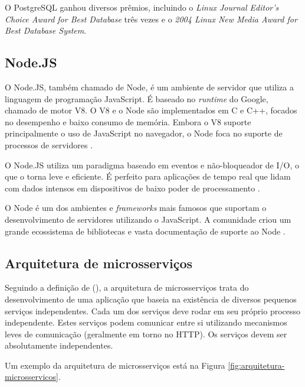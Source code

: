 O PostgreSQL ganhou diversos prêmios, incluindo o \textit{Linux Journal Editor's Choice Award for Best Database} três vezes e o \textit{2004 Linux New Media Award for Best Database System}.

\subsection{Node.JS}

O Node.JS, também chamado de Node, é um ambiente de servidor que utiliza a linguagem de programação JavaScript. É baseado no \textit{runtime} do Google, chamado de motor V8. O V8 e o Node são implementados em C e C++, focados no desempenho e baixo consumo de memória. Embora o V8 suporte principalmente o uso de JavaScript no navegador, o Node foca no suporte de processos de servidores \cite{Tilkov2010}.

O Node.JS utiliza um paradigma baseado em eventos e não-bloqueador de I/O, o que o torna leve e eficiente. É perfeito para aplicações de tempo real que lidam com dados intensos em dispositivos de baixo poder de processamento \cite{Sapes2016}.

O Node é um dos ambientes e \textit{frameworks} mais famosos que suportam o desenvolvimento de servidores utilizando o JavaScript. A comunidade criou um grande ecossistema de bibliotecas e vasta documentação de suporte ao Node \cite{Tilkov2010}.

\subsection{Arquitetura de microsserviços}

Seguindo a definição de \citeauthor{ms1} (\citeyear{ms1}), a arquitetura de microsserviços trata do desenvolvimento de uma aplicação que baseia na existência de diversos pequenos serviços independentes. Cada um dos serviços deve rodar em seu próprio processo independente. Estes serviços podem comunicar entre si utilizando mecanismos leves de comunicação (geralmente em torno no HTTP). Os serviços devem ser absolutamente independentes.

Um exemplo da arquitetura de microsserviços está na Figura \ref{fig:arquitetura-microsservicos}.

